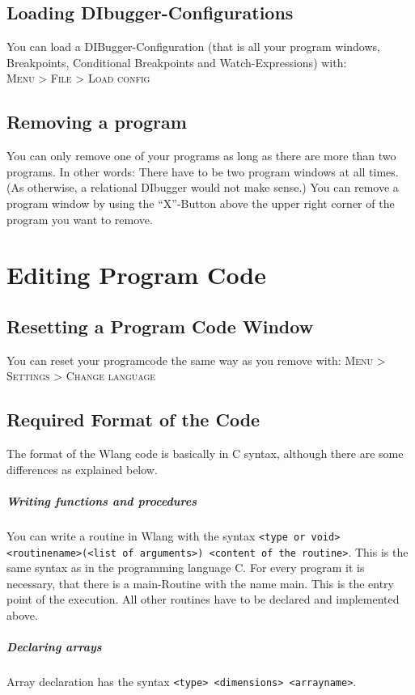 \documentclass[parskip=full]{memoir}
\begin{document}
\section{Loading DIbugger-Configurations}
You can load a DIBugger-Configuration (that is all your program windows, Breakpoints, Conditional Breakpoints and Watch-Expressions) with:\\
\textsc{Menu > File > Load config}
\section{Removing a program}\label{removeProgram}
You can only remove one of your programs as long as there are more than two programs. In other words: There have to be two program windows at all times. (As otherwise, a relational DIbugger would not make sense.)
You can remove a program window by using the \enquote{X}-Button above the upper right corner of the program you want to remove.
\chapter{Editing Program Code} %
\section{Resetting a Program Code Window}
You can reset your programcode the same way as you remove with:
 \textsc{Menu > Settings > Change language}
\section{Required Format of the Code}
The format of the Wlang code is basically in C syntax, although there are some differences as explained below.
\paragraph{Writing functions and procedures}
You can write a routine in Wlang with the syntax \texttt{<type or void> <routinename>(<list of arguments>) <content of the routine>}. This is the same syntax as in the programming language C. For every program it is necessary, that there is a main-Routine with the name main. This is the entry point of the execution. All other routines have to be declared and implemented above.
\paragraph{Declaring arrays}
Array declaration has the syntax \texttt{<type> <dimensions> <arrayname>}. 
\end{document}
